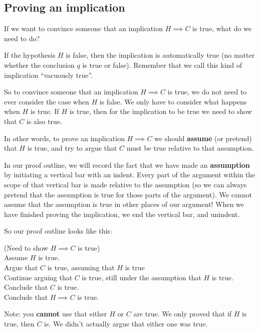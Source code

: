 \subsection{Proving an implication}

If we want to convince someone that an implication $H \implies C$ is true, what do we need to do?

If the hypothesis $H$ is false, then the implication is automatically true (no matter whether the conclusion $q$ is true or false).  Remember that we call this kind of implication ``vacuously true''.  

So to convince someone that an implication $H \implies C$ is true, we do not need to ever consider the case when $H$ is false.  We only have to consider what happens when $H$ is true.  If $H$ is true, then for the implication to be true we need to show that $C$ is also true.

In other words, to prove an implication $H \implies C$ we should \textbf{assume} (or pretend) that $H$ is true, and try to argue that $C$ must be true relative to that assumption.

In our proof outline, we will record the fact that we have made an \textbf{assumption} by initiating a vertical bar with an indent.  Every part of the argument within the scope of that vertical bar is made relative to the assumption (so we can always pretend that the assumption is true for those parts of the argument).  We cannot assume that the assumption is true in other places of our argument!  When we have finished proving the implication, we end the vertical bar, and unindent.

So our proof outline looks like this:

\begin{fitch*}
	\textrm{(Need to show $H \implies C$ is true)}\\
	\textrm{Assume $H$ is true.}\\
	\fa \textrm{ Argue that $C$ is true, assuming that $H$ is true}\\
	\fa \textrm{ Continue arguing that $C$ is true, still under the assumption that $H$ is true.}\\
	\fa \textrm{ Conclude that $C$ is true.}\\
	\textrm{Conclude that $H \implies C$ is true.}\\
\end{fitch*}

Note:  you \textbf{cannot} use that either $H$ or $C$ are true.  We only proved that if $H$ is true, then $C$ is.  We didn't actually argue that either one was true.

